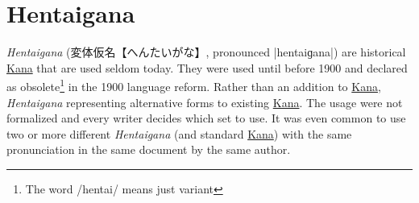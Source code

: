 

\section{Hentaigana}
\label{sec:Hentaigana}

\textit{Hentaigana} (変体仮名【へんたいがな】, pronounced |hentaiɡana|) are
historical \hyperref[sec:Kana]{Kana} that are used seldom today. They were used
until before 1900 and declared as obsolete\footnote{The word /hentai/ means
just variant} in the 1900 language reform. Rather than an addition to
\hyperref[sec:Kana]{Kana}, \textit{Hentaigana} representing alternative forms
to existing \hyperref[sec:Kana]{Kana}. The usage were not formalized and every
writer decides which set to use. It was even common to use two or more
different \textit{Hentaigana} (and standard \hyperref[sec:Kana]{Kana}) with
the same pronunciation in the same document by the same author.

